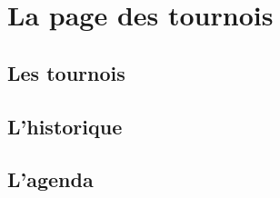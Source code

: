 \section{La page des tournois}

\subsection{Les tournois}

\subsection{L'historique}

\subsection{L'agenda}

